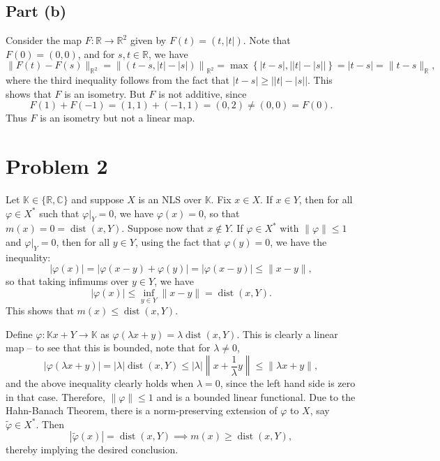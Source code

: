 \documentclass[11pt]{article}
\theoremstyle{thmstyle}
\theoremstyle{defstyle}
\newcommand{\R}{\mathbb{R}}
\newcommand{\bbC}{\mathbb{C}}
\newcommand{\K}{\mathbb{K}} %
\newcommand{\wt}[1]{\widetilde{#1}}
\renewcommand{\le}{\leqslant}
\renewcommand{\ge}{\geqslant}
\newcommand{\dist}{\operatorname{dist}}
\begin{document}
\subsection{Part (b)}

Consider the map $F\colon\R\to\R^2$ given by $F(t) = (t, |t|)$. Note that $F(0) = (0, 0)$, and for $s, t\in\R$, we have 
\begin{equation*}
    \|F(t) - F(s)\|_{\R^2} = \left\|\left(t - s, |t| - |s|\right)\right\|_{\R^2} = \max\left\{|t - s|, \left||t| - |s|\right|\right\} = |t - s| = \|t - s\|_{\R},
\end{equation*}
where the third inequality follows from the fact that $|t - s|\ge\left||t| - |s|\right|$. This shows that $F$ is an isometry. But $F$ is not additive, since 
\begin{equation*}
    F(1) + F(-1) = (1, 1) + (-1, 1) = (0, 2)\ne (0, 0) = F(0).
\end{equation*}
Thus $F$ is an isometry but not a linear map.

\section{Problem 2}

Let $\K\in\{\R,\bbC\}$ and suppose $X$ is an NLS over $\K$. Fix $x\in X$. If $x\in Y$, then for all $\varphi\in X^\ast$ such that $\varphi|_Y = 0$, we have $\varphi(x) = 0$, so that $m(x) = 0 = \dist(x, Y)$. Suppose now that $x\notin Y$. If $\varphi\in X^\ast$ with $\|\varphi\|\le 1$ and $\varphi|_Y = 0$, then for all $y\in Y$, using the fact that $\varphi(y) = 0$, we have the inequality: 
\begin{equation*}
    |\varphi(x)| = |\varphi(x - y) + \varphi(y)| = |\varphi(x - y)|\le \|x - y\|,
\end{equation*}
so that taking infimums over $y\in Y$, we have 
\begin{equation*}
    |\varphi(x)|\le\inf_{y\in Y} \|x - y\| = \dist(x, Y).
\end{equation*}
This shows that $m(x)\le \dist(x, Y)$.

Define $\varphi\colon\K x + Y\to\K$ as $\varphi(\lambda x + y) = \lambda\dist(x, Y)$. This is clearly a linear map -- to see that this is bounded, note that for $\lambda\ne 0$, 
\begin{equation*}
    \left|\varphi(\lambda x + y)\right| = |\lambda|\dist(x, Y)\le |\lambda|\left\|x + \frac{1}{\lambda}y\right\|\le\|\lambda x + y\|,
\end{equation*}
and the above inequality clearly holds when $\lambda = 0$, since the left hand side is zero in that case. Therefore, $\|\varphi\|\le 1$ and is a bounded linear functional. Due to the Hahn-Banach Theorem, there is a norm-preserving extension of $\varphi$ to $X$, say $\wt\varphi\in X^\ast$. Then 
\begin{equation*}
    |\wt\varphi(x)| = \dist(x, Y)\implies m(x)\ge\dist(x, Y),
\end{equation*}
thereby implying the desired conclusion.
\end{document}
